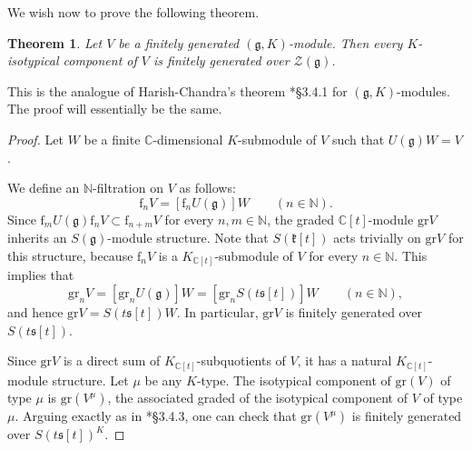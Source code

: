 \documentclass{amsart}
\newtheorem{theorem}{Theorem}[section]
\theoremstyle{definition}
\begin{document}
We wish now to prove the following theorem.

\begin{theorem} \label{finitely_gen_center}
    Let $V$ be a finitely generated $(\bm{\mathfrak{g}},K)$-module. Then every $K$-isotypical component of $V$ is finitely generated over $\mathcal{Z}(\bm{\mathfrak{g}})$.
\end{theorem}

This is the analogue of Harish-Chandra's theorem \cite{Wallach}*{§3.4.1} for $(\bm{\mathfrak{g}},K)$-modules. The proof will essentially be the same.

\begin{proof}
    Let $W$ be a finite $\mathbb{C}$-dimensional $K$-submodule of $V$ such that $U(\bm{\mathfrak{g}})W = V$.
    
    We define an $\mathbb{N}$-filtration on $V$ as follows:
    \[\mathrm{f}_{n}V = [\mathrm{f}_nU(\bm{\mathfrak{g}})]W \qquad (n \in \mathbb{N}).\]
    Since $\mathrm{f}_m U(\bm{\mathfrak{g}}) \mathrm{f}_n V \subset \mathrm{f}_{n+m}V$ for every $n,m \in \mathbb{N}$, the graded $\mathbb{C}[t]$-module $\mathrm{gr}V$ inherits an $S(\bm{\mathfrak{g}})$-module structure. Note that $S(\mathfrak{k}[t])$ acts trivially on $\mathrm{gr} V$ for this structure, because $\mathrm{f}_n V$ is a $K_{\mathbb{C}[t]}$-submodule of $V$ for every $n \in \mathbb{N}$. This implies that \[\mathrm{gr}_n V = [\mathrm{gr}_nU(\mathfrak{g})] W =  [\mathrm{gr}_nS(t\mathfrak{s}[t]) ]W\qquad (n \in \mathbb{N}),\] and hence $\mathrm{gr} V = S(t\mathfrak{s}[t]) W$. In particular, $\mathrm{gr} V$ is finitely generated over $S(t\mathfrak{s}[t])$.

    Since $\mathrm{gr} V$ is a direct sum of $K_{\mathbb{C}[t]}$-subquotients of $V$, it has a natural $K_{\mathbb{C}[t]}$-module structure. Let $\mu$ be any $K$-type. The isotypical component of $\mathrm{gr}(V)$ of type $\mu$ is $\mathrm{gr}(V^\mu)$, the associated graded of the isotypical component of $V$ of type $\mu$. Arguing exactly as in \cite{Wallach}*{§3.4.3}, one can check that $\mathrm{gr}(V^\mu)$ is finitely generated over $S(t\mathfrak{s}[t])^K$.


\end{proof}
\end{document}
